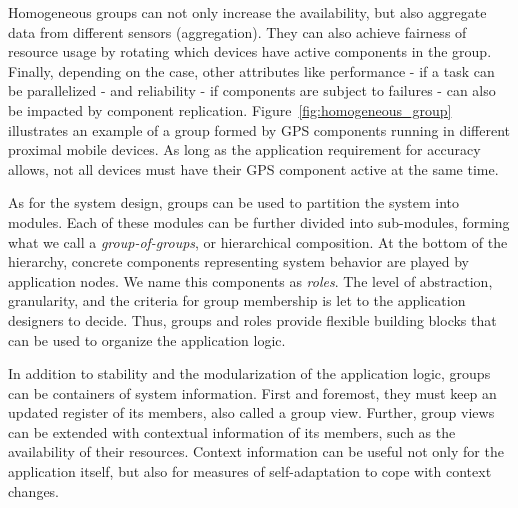 Homogeneous groups can not only increase the availability, but also aggregate data from different sensors (aggregation). They can also achieve fairness of resource usage by rotating which devices have active components in the group. Finally, depending on the case, other attributes like performance - if a task can be parallelized - and reliability - if components are subject to failures - can also be impacted by component replication. Figure~\ref{fig:homogeneous_group} illustrates an example of a group formed by GPS components running in different proximal mobile devices. As long as the application requirement for accuracy allows, not all devices must have their GPS component active at the same time.



As for the system design, groups can be used to partition the system into modules. Each of these modules can be further divided into sub-modules, forming what we call a \textit{group-of-groups}, or hierarchical composition. At the bottom of the hierarchy, concrete components representing system behavior are played by application nodes. We name this components as \textit{roles}. The level of abstraction, granularity, and the criteria for group membership is let to the application designers to decide. Thus, groups and roles provide flexible building blocks that can be used to organize the application logic.


In addition to stability and the modularization of the application logic, groups can be containers of system information. First and foremost, they must keep an updated register of its members, also called a group view. Further, group views can be extended with contextual information of its members, such as the availability of their resources. Context information can be useful not only for the application itself, but also for measures of self-adaptation to cope with context changes. 

